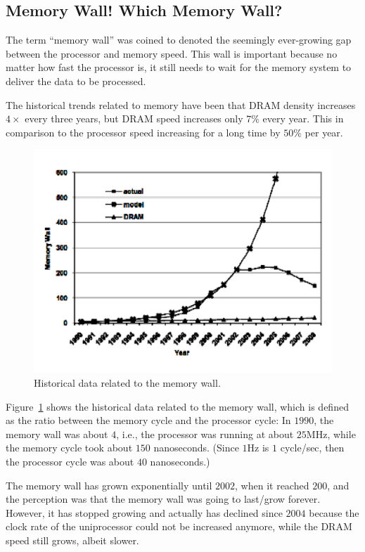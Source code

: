 \documentclass[acmsmall,review]{acmart}\settopmatter{printfolios=true,printccs=false,printacmref=false}
\begin{document}
\subsection{Memory Wall! Which Memory Wall?}

The term ``memory wall'' was coined to denoted the seemingly
ever-growing gap between the processor and memory speed. This
wall is important because no matter how fast the processor is, 
it still needs to wait for the memory system to deliver the 
data to be processed. 

The historical trends related to memory have been that DRAM density 
increases $4\times$ every three years, but DRAM speed increases
only $7\%$ every year. This in comparison to the processor speed
increasing for a long time by $50\%$ per year.

\begin{figure}
\includegraphics[width=90ex]{Figures/L1/MemWall}
\caption{Historical data related to the memory wall.}
\label{fig:mem-wall}
\end{figure} 

Figure~\ref{fig:mem-wall} shows the historical data related to
the memory wall, which is defined as the ratio between the memory
cycle and the processor cycle: In $1990$, the memory wall was about
$4$, i.e., the processor was running at about $25$MHz, while the 
memory cycle took about $150$ nanoseconds. (Since $1$Hz is $1$ 
cycle/sec, then the processor cycle was about $40$ nanoseconds.)

The memory wall has grown exponentially until $2002$, when it
reached $200$, and the perception was that the memory wall was 
going to last/grow forever.   However, it has stopped growing 
and actually has declined since $2004$ because the clock rate 
of the uniprocessor could not be increased anymore, while the 
DRAM speed still grows, albeit slower.   
\end{document}
